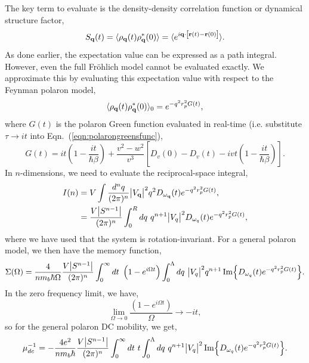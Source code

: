 The key term to evaluate is the density-density correlation function or dynamical structure factor,
\begin{equation}
    S_{\vb{q}}(t) = \langle \rho_{\vb{q}}(t) \rho^*_{\vb{q}}(0) \rangle = \langle e^{i \vb{q} \cdot \left[ \vb{r}(t) - \vb{r}(0) \right]} \rangle.
\end{equation}
As done earlier, the expectation value can be expressed as a path integral. However, even the full Fr\"ohlich model cannot be evaluated exactly. We approximate this by evaluating this expectation value with respect to the Feynman polaron model,
\begin{equation}
    \langle \rho_{\vb{q}}(t) \rho^*_{\vb{q}}(0) \rangle_0 = e^{-q^2 r_p^2 G(t)},
\end{equation}
where $G(t)$ is the polaron Green function evaluated in real-time (i.e. substitute $\tau \to it$ into Eqn.~(\ref{eqn:polarongreensfunc}),
\begin{equation}
    G(t) = i t \left(1 - \frac{i t}{\hbar \beta} \right) + \frac{v^2 - w^2}{v^3} \left[ D_v(0) - D_v(t)  - i v t \left(1 - \frac{i t}{\hbar \beta} \right) \right].
\end{equation}
In $n$-dimensions, we need to evaluate the reciprocal-space integral,
\begin{equation}
    \begin{aligned}
        I(n) &= V \int \frac{d^n q}{(2\pi)^n} \abs{V_{\vb{q}}}^2 q^2 D_{\omega_{\vb{q}}}(t) e^{-q^2 r_p^2 G(t)}, \\
        &= \frac{V \abs{S^{n-1}}}{(2\pi)^n} \int_0^R dq\ q^{n+1} \abs{V_{q}}^2 D_{\omega_{q}}(t) e^{-q^2 r_p^2 G(t)} ,
    \end{aligned}
\end{equation}
where we have used that the system is rotation-invariant. For a general polaron model, we then have the memory function,
\begin{equation}
    \Sigma(\Omega) = \frac{4}{n m_b\hbar\Omega} \frac{V \abs{S^{n-1}}}{(2\pi)^n} \int_0^\infty dt\ \left(1 - e^{i \Omega t}\right) \int_0^\Lambda dq\ \abs{V_{q}}^2 q^{n+1} \Im{D_{\omega_q}(t) e^{-q^2 r_p^2 G(t)}}.
\end{equation}
In the zero frequency limit, we have,
\begin{equation}
    \lim_{\Omega \to 0} \frac{\left(1 - e^{i \Omega t}\right)}{\Omega} \to -i t,
\end{equation}
so for the general polaron DC mobility, we get,
\begin{equation}
    \mu_{dc}^{-1} = -\frac{4 e^2}{n m_b \hbar} \frac{V \abs{S^{n-1}}}{(2\pi)^n} \int_0^\infty dt\ t \int_0^\Lambda dq\ q^{n+1} \abs{V_{q}}^2 \Im{ D_{\omega_{q}}(t) e^{-q^2 r_p^2 G(t)}} .
\end{equation}

